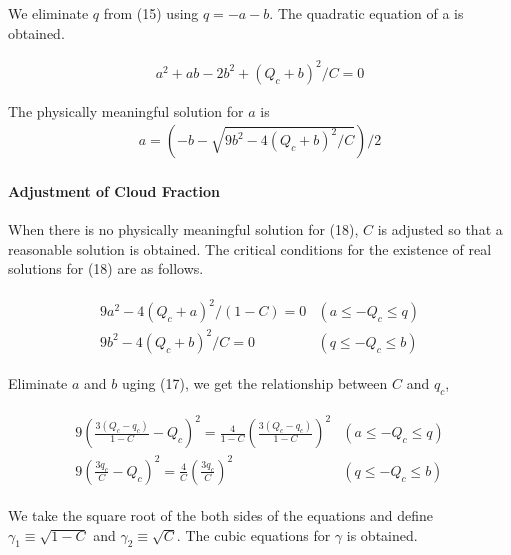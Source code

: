 We eliminate \(q\) from (15) using \(q = -a-b\). The quadratic equation
of a is obtained.

\begin{eqnarray}
a^{2}+ab-2 b^{2}+\left(Q_{c}+b\right)^{2} / C=0
\label{E08-17}
\end{eqnarray}

The physically meaningful solution for \(a\) is \begin{eqnarray}
a=\left(-b-\sqrt{9 b^{2}-4\left(Q_{c}+b\right)^{2} / C}\right) / 2
\label{E08-18}
\end{eqnarray}

\hypertarget{adjustment-of-cloud-fraction}{%
\paragraph{Adjustment of Cloud
Fraction}\label{adjustment-of-cloud-fraction}}

When there is no physically meaningful solution for (18), \(C\) is
adjusted so that a reasonable solution is obtained. The critical
conditions for the existence of real solutions for (18) are as follows.

\begin{eqnarray}
\begin{array}{ll}
9 a^{2}-4\left(Q_{c}+a\right)^{2} /(1-C)=0 & \left(a \leq-Q_{c} \leq q\right) \\
9 b^{2}-4\left(Q_{c}+b\right)^{2} / C=0 & \left(q \leq-Q_{c} \leq b\right)
\end{array}
\end{eqnarray}

Eliminate \(a\) and \(b\) uging (17), we get the relationship between
\(C\) and \(q_c\),

\begin{eqnarray}
\begin{array}{ll}
9\left(\frac{3\left(Q_{c}-q_{c}\right)}{1-C}-Q_{c}\right)^{2}=\frac{4}{1-C}\left(\frac{3\left(Q_{c}-q_{c}\right)}{1-C}\right)^{2} & \left(a \leq-Q_{c} \leq q\right) \\
9\left(\frac{3 q_{c}}{C}-Q_{c}\right)^{2}=\frac{4}{C}\left(\frac{3 q_{c}}{C}\right)^{2} & \left(q \leq-Q_{c} \leq b\right)
\end{array}
\end{eqnarray}

We take the square root of the both sides of the equations and define
\(\gamma_{1} \equiv\sqrt{1-C}\) and \(\gamma_{2} \equiv\sqrt{C}\). The
cubic equations for \(\gamma\) is obtained.

